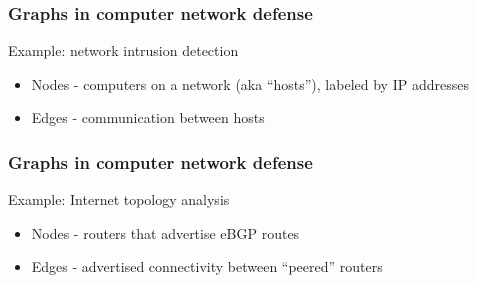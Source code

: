 \documentclass[11pt,table]{beamer}
\begin{document}
\begin{frame}
\frametitle{Graphs in computer network defense}
Example: network intrusion detection
\bigskip
\begin{itemize}
  \item{Nodes - computers on a network (aka ``hosts''), labeled by IP addresses}
    \medskip
  \item{Edges - communication between hosts}
  \end{itemize}
  \end{frame}

   \begin{frame}
\frametitle{Graphs in computer network defense}
Example: Internet topology analysis
\bigskip
\begin{itemize}
  \item{Nodes - routers that advertise eBGP routes}
    \medskip
  \item{Edges - advertised connectivity between ``peered'' routers}
  \end{itemize}
  \end{frame}
\end{document}

